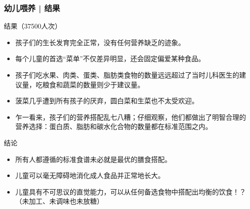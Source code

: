 \begin{frame}
  \frametitle{幼儿喂养 | 结果}
  \vspace{-0.5em}
  \begin{block}{结果（37500人次）}
    \begin{itemize}
      \item 孩子们的生长发育完全正常，没有任何营养缺乏的迹象。
      \item 每个儿童的首选“菜单”不仅差异明显，还会固定偏爱某种食品。
      \item 孩子们吃水果、肉类、蛋类、脂肪类食物的数量远远超过了当时儿科医生的建议量，吃粮食和蔬菜的数量则少于建议量。
      \item 菠菜几乎遭到所有孩子的厌弃，圆白菜和生菜也不太受欢迎。
      \item 乍一看来，孩子们的营养搭配乱七八糟；仔细观察，他们都做出了明智合理的营养选择：蛋白质、脂肪和碳水化合物的数量都在标准范围之内。
    \end{itemize}
  \end{block}
  \vspace{-0.5em}
  \pause
  \begin{block}{结论}
    \begin{itemize}
      \item 所有人都遵循的标准食谱未必就是最优的膳食搭配。
      \item 儿童可以毫无障碍地消化成人食品并正常地长大。
      \item 儿童具有不可思议的直觉能力，可以从任何备选食物中搭配出均衡的饮食\alert{！？}（未加工、未调味也未放糖）
    \end{itemize}
  \end{block}
\end{frame}

